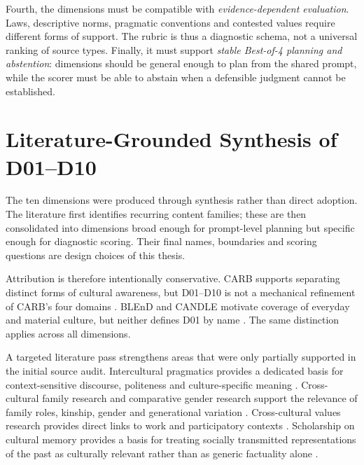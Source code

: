 Fourth, the dimensions must be compatible with \emph{evidence-dependent evaluation}. Laws, descriptive norms, pragmatic conventions and contested values require different forms of support. The rubric is thus a diagnostic schema, not a universal ranking of source types. Finally, it must support \emph{stable Best-of-4 planning and abstention}: dimensions should be general enough to plan from the shared prompt, while the scorer must be able to abstain when a defensible judgment cannot be established.

\section{Literature-Grounded Synthesis of D01--D10}
\label{sec:dimension-synthesis}

The ten dimensions were produced through synthesis rather than direct adoption. The literature first identifies recurring content families; these are then consolidated into dimensions broad enough for prompt-level planning but specific enough for diagnostic scoring. Their final names, boundaries and scoring questions are design choices of this thesis.

Attribution is therefore intentionally conservative. CARB supports separating distinct forms of cultural awareness, but D01--D10 is not a mechanical refinement of CARB's four domains \parencite{zhang2026carb}. BLEnD and CANDLE motivate coverage of everyday and material culture, but neither defines D01 by name \parencite{myung2024blend,nguyen2023candle}. The same distinction applies across all dimensions.

A targeted literature pass strengthens areas that were only partially supported in the initial source audit. Intercultural pragmatics provides a dedicated basis for context-sensitive discourse, politeness and culture-specific meaning \parencite{kecskes2014intercultural}. Cross-cultural family research and comparative gender research support the relevance of family roles, kinship, gender and generational variation \parencite{georgas2006families,inglehartnorris2003rising}. Cross-cultural values research provides direct links to work and participatory contexts \parencite{schwartz1999culturalvalues,inglehartbaker2000modernization}. Scholarship on cultural memory provides a basis for treating socially transmitted representations of the past as culturally relevant rather than as generic factuality alone \parencite{assmann1995collective}.

